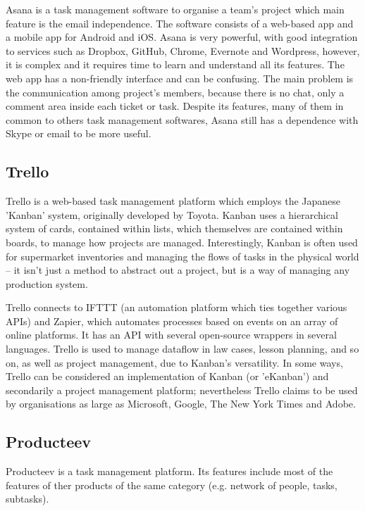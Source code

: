 \documentclass[a4paper]{l3proj}
\begin{document}
Asana is a task management software to organise a team's project which main
feature is the email independence. The software consists of a web-based app and
a mobile app for Android and iOS. Asana is very powerful, with good integration
to services such as Dropbox, GitHub, Chrome, Evernote and Wordpress, however, it
is complex and it requires time to learn and understand all its features. The
web app has a non-friendly interface and can be confusing. The main problem is
the communication among project's members, because there is no chat, only a
comment area inside each ticket or task. Despite its features, many of them in
common to others task management softwares, Asana still has a dependence with
Skype or email to be more useful.

\subsection{Trello}
\label{trello}\par
Trello is a web-based task management platform which employs the Japanese 'Kanban'
system, originally developed by Toyota. Kanban uses a hierarchical system of
cards, contained within lists, which themselves are contained within boards, to
manage how projects are managed. Interestingly, Kanban is often used for
supermarket inventories and managing the flows of tasks in the physical world --
it isn't just a method to abstract out a project, but is a way of managing any
production system.\par
Trello connects to IFTTT (an automation platform which ties together various APIs)
and Zapier, which automates processes based on events on an array of online
platforms. It has an API with several open-source wrappers in several languages.
Trello is used to manage dataflow in law cases, lesson planning, and so on, as
well as project management, due to Kanban's versatility.
In some ways, Trello can be considered an implementation of Kanban (or 'eKanban')
and secondarily a project management platform; nevertheless Trello claims to be
used by organisations as large as Microsoft, Google, The New York Times and
Adobe. 


\subsection{Producteev}
\label{producteev}

Producteev is a task management platform. Its features include most of the features of ther products of the same
category (e.g. network of people, tasks, subtasks).
\end{document}
